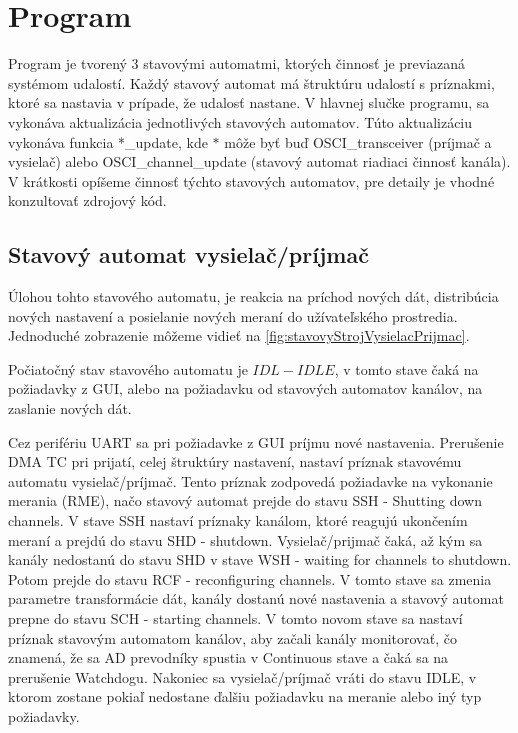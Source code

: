 \documentclass[main.tex]{subfiles}
\begin{document}
	\section{Program}
		\begin{multicols*}{2}
			\noindent Program je tvorený 3 stavovými automatmi, ktorých činnosť je previazaná systémom udalostí. Každý stavový automat má štruktúru udalostí s  príznakmi, ktoré sa nastavia v prípade, že udalosť nastane. V hlavnej slučke programu, sa vykonáva aktualizácia jednotlivých stavových automatov. Túto aktualizáciu vykonáva funkcia *\_update, kde $*$ môže byť buď OSCI\_transceiver (príjmač a vysielač) alebo OSCI\_channel\_update (stavový automat riadiaci činnosť kanála). V krátkosti opíšeme činnosť týchto stavových automatov, pre detaily je vhodné konzultovať zdrojový kód. %
			
			\subsection{Stavový automat vysielač/príjmač}
			Úlohou tohto stavového automatu, je reakcia na príchod nových dát, distribúcia nových nastavení a posielanie nových meraní do užívateľského prostredia. Jednoduché zobrazenie môžeme vidieť na \cref{fig:stavovyStrojVysielacPrijmac}.
			
			
			Počiatočný stav stavového automatu je $IDL-IDLE$, v tomto stave čaká na požiadavky z GUI, alebo na požiadavku od stavových automatov kanálov, na zaslanie nových dát.
			
			Cez perifériu UART sa pri požiadavke z GUI príjmu nové nastavenia. Prerušenie DMA TC pri prijatí, celej štruktúry nastavení, nastaví príznak stavovému automatu vysielač/príjmač. Tento príznak zodpovedá požiadavke na vykonanie merania (RME), načo stavový automat prejde do stavu SSH - Shutting down channels. V stave SSH nastaví príznaky kanálom, ktoré reagujú ukončením meraní a prejdú do stavu SHD - shutdown. Vysielač/prijmač čaká, až kým sa kanály nedostanú do stavu SHD v stave WSH - waiting for channels to shutdown. Potom prejde do stavu RCF - reconfiguring channels. V tomto stave sa zmenia parametre transformácie dát, kanály dostanú nové nastavenia a stavový automat prepne do stavu SCH - starting channels. V tomto novom stave sa nastaví príznak stavovým automatom kanálov, aby začali kanály monitorovať, čo znamená, že sa AD prevodníky spustia v Continuous stave a čaká sa na prerušenie Watchdogu. Nakoniec sa vysielač/príjmač vráti do stavu IDLE, v ktorom zostane pokiaľ nedostane ďalšiu požiadavku na meranie alebo iný typ požiadavky.
			

\end{multicols*}
\end{document}
